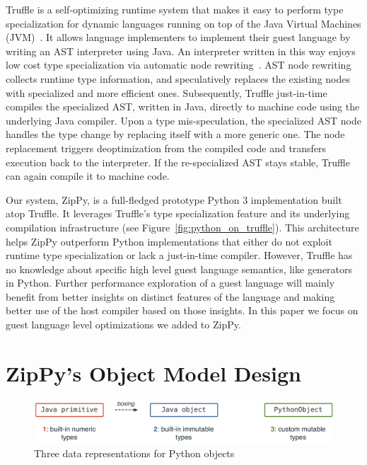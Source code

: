 Truffle is a self-optimizing runtime system that makes it easy to perform type specialization for dynamic languages running on top of the Java Virtual Machines (JVM)~\cite{Wurthinger+13}.
It allows language implementers to implement their guest language by writing an AST interpreter using Java.
An interpreter written in this way enjoys low cost type specialization via automatic node rewriting~\cite{Wurthinger+12,Brunthaler2010inca,Brunthaler2010quickening}.
AST node rewriting collects runtime type information, and speculatively replaces the existing nodes with specialized and more efficient ones.
Subsequently, Truffle just-in-time compiles the specialized AST, written in Java, directly to machine code using the underlying Java compiler.
Upon a type mis-speculation, the specialized AST node handles the type change by replacing itself with a more generic one.
The node replacement triggers deoptimization from the compiled code and transfers execution back to the interpreter.
If the re-specialized AST stays stable, Truffle can again compile it to machine code.

Our system, ZipPy, is a full-fledged prototype Python 3 implementation built atop Truffle.
It leverages Truffle's type specialization feature and its underlying compilation infrastructure (see Figure~\ref{fig:python_on_truffle}).
This architecture helps ZipPy outperform Python implementations that either do not exploit runtime type specialization or lack a just-in-time compiler.
However, Truffle has no knowledge about specific high level guest language semantics, like generators in Python.
Further performance exploration of a guest language will mainly benefit from better insights on distinct features of the language and making better use of the host compiler based on those insights.
In this paper we focus on guest language level optimizations we added to ZipPy.

\section{ZipPy's Object Model Design}

\begin{figure}
\centering
\includegraphics[scale=.34]{figures/three-data-representations}
\caption{Three data representations for Python objects}
\label{fig:three-data-representations}
\end{figure}

